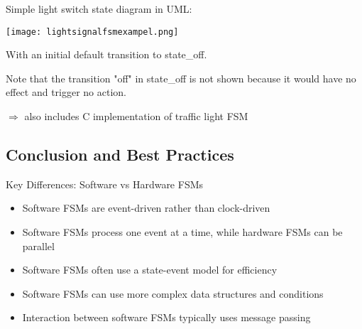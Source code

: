 \begin{example}
Simple light switch state diagram in UML:

\texttt{[image: lightsignalfsmexampel.png]}

With an initial default transition to state\_off.

Note that the transition "off" in state\_off is not shown because it would have no effect and trigger no action.
\end{example}

$\Rightarrow$ also includes C implementation of traffic light FSM

\subsection{Conclusion and Best Practices}

\begin{concept}{Key Differences: Software vs Hardware FSMs}
\begin{itemize}
    \item Software FSMs are event-driven rather than clock-driven
    \item Software FSMs process one event at a time, while hardware FSMs can be parallel
    \item Software FSMs often use a state-event model for efficiency
    \item Software FSMs can use more complex data structures and conditions
    \item Interaction between software FSMs typically uses message passing
\end{itemize}
\end{concept}

